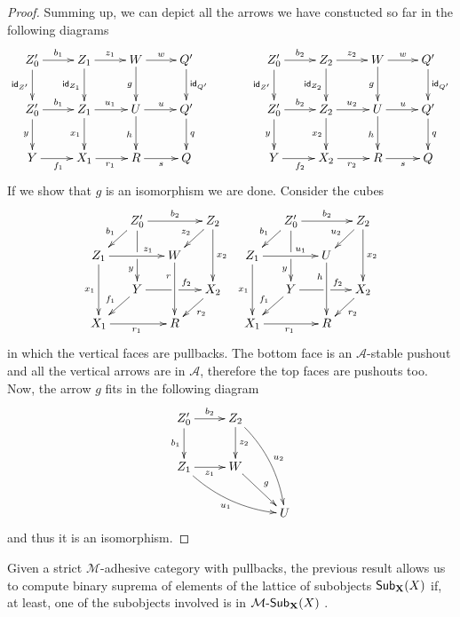 \documentclass[a4paper]{article}
\newcommand{\sub}[3]{{\mathcal{#1}}\textrm{-}\mathsf{Sub}_{\textbf {\textup{#2}}}(#3)}
\newcommand{\msub}[2]{\mathsf{Sub}_{\textbf {\textup{#1}}}(#2)}
\newcommand{\id}[1]{\mathsf{id}_{#1}}
\def\X{\textbf {\textup{X}}}
\theoremstyle{definition}
\begin{document}
\begin{proof}
	Summing up, we can depict all the arrows we have constucted so far in the following diagrams
	\[\xymatrix{Z'_0 \ar[r]^{b_1} \ar[d]_{\id{Z'}}& Z_1 \ar[r]^{z_1} \ar[d]_{\id{Z_1}} &  W \ar[d]_g \ar[r]^{w} & Q' \ar[d]^{\id{Q'}}&& Z'_0 \ar[r]^{b_2}  \ar[d]_{\id{Z'}}& Z_2 \ar[d]_{\id{Z_2}} \ar[r]^{z_2}&  W \ar[d]_g\ar[r]^{w}& Q' \ar[d]^{\id{Q'}}\\ Z'_0 \ar[d]_{y} \ar[r]^{b_1} & Z_1  \ar[r]^{u_1}\ar[d]_{x_1}&  U \ar[d]_h \ar[r]^{u} & Q'  \ar[d]^{q}& &Z'_0  \ar[d]_{y}\ar[r]^{b_2}  & Z_2  \ar[r]^{u_2}\ar[d]_{x_2} &  U \ar[d]_h \ar[r]^{u}& Q' \ar[d]^{q} \\ Y \ar[r]_{f_1}& X_1 \ar[r]_{r_1} & R \ar[r]_s& Q & &Y \ar[r]_{f_2} & X_2 \ar[r]_{r_2}& R \ar[r]_s & Q}\]
	If we show that $g$ is an isomorphism we are done. Consider the cubes
	\[\xymatrix@C=13pt@R=13pt{&Z_0'\ar[dd]|\hole_(.7){y}\ar[rr]^{b_2} \ar[dl]_{b_1} && Z_2 \ar[dd]^{x_2} \ar[dl]_{z_2}  &&Z'_0\ar[dd]|\hole_(.7){y}\ar[rr]^{b_2} \ar[dl]_{b_1} && Z_2 \ar[dd]^{x_2} \ar[dl]_{u_2}\\Z_1  \ar[dd]_{x_1}\ar[rr]^(.65){z_1} & & W \ar[dd]_(.3){r}&& Z_1  \ar[dd]_{x_1}\ar[rr]^(.65){u_1} & &U \ar[dd]_(.3){h}\\&Y\ar[rr]|\hole^(.65){f_2} \ar[dl]_{f_1} && X_2 \ar[dl]^{r_2} && Y\ar[rr]|\hole^(.65){f_2} \ar[dl]_{f_1} && X_2 \ar[dl]^{r_2}\\X_1 \ar[rr]_{r_1} & & R && X_1 \ar[rr]_{r_1} & & R}\]
	in which the vertical faces are pullbacks. The bottom face is an $\mathcal{A}$-stable pushout and all the vertical arrows are in $\mathcal{A}$, therefore the top faces are pushouts too. Now,  the arrow $g$ fits in the following  diagram
	\[\xymatrix{Z'_0\ar[r]^{b_2} \ar[d] _{b_1}& Z_2 \ar@/^.3cm/[ddr]^{u_2}\ar[d]^{z_2} \\ Z_1 \ar[r]_{z_1}  \ar@/_.3cm/[drr]_{u_1}& W \ar[dr]^{g} \\ &&U}\]
	and thus it is an isomorphism.
\end{proof} 


Given a strict $\mathcal{M}$-adhesive category with pullbacks, the previous result allows us to compute binary suprema of elements of the lattice of subobjects $\msub{X}{X}$ if, at least, one of the subobjects involved is in $\sub{M}{X}{X}$ .
\end{document}
